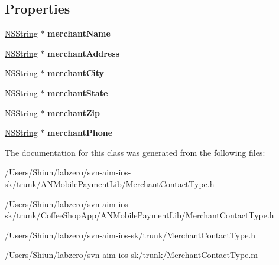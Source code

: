 \subsection*{Properties}
\begin{DoxyCompactItemize}
\item 
\hypertarget{interface_merchant_contact_type_a8791a083c70da0d6d590feb8400e52db}{
\hyperlink{class_n_s_string}{NSString} $\ast$ {\bfseries merchantName}}
\label{interface_merchant_contact_type_a8791a083c70da0d6d590feb8400e52db}

\item 
\hypertarget{interface_merchant_contact_type_a1dd3df16e04326b6a33e946027045009}{
\hyperlink{class_n_s_string}{NSString} $\ast$ {\bfseries merchantAddress}}
\label{interface_merchant_contact_type_a1dd3df16e04326b6a33e946027045009}

\item 
\hypertarget{interface_merchant_contact_type_ae1e86d3cc907483cd8f7ae2d26bd11ab}{
\hyperlink{class_n_s_string}{NSString} $\ast$ {\bfseries merchantCity}}
\label{interface_merchant_contact_type_ae1e86d3cc907483cd8f7ae2d26bd11ab}

\item 
\hypertarget{interface_merchant_contact_type_a76dc246ce315ada6152beb62e1dfb97c}{
\hyperlink{class_n_s_string}{NSString} $\ast$ {\bfseries merchantState}}
\label{interface_merchant_contact_type_a76dc246ce315ada6152beb62e1dfb97c}

\item 
\hypertarget{interface_merchant_contact_type_adf19fed08343076b6c615b78acbfcd4e}{
\hyperlink{class_n_s_string}{NSString} $\ast$ {\bfseries merchantZip}}
\label{interface_merchant_contact_type_adf19fed08343076b6c615b78acbfcd4e}

\item 
\hypertarget{interface_merchant_contact_type_a9ce67a52317d9ebedbd4b31e907bdf7b}{
\hyperlink{class_n_s_string}{NSString} $\ast$ {\bfseries merchantPhone}}
\label{interface_merchant_contact_type_a9ce67a52317d9ebedbd4b31e907bdf7b}

\end{DoxyCompactItemize}


The documentation for this class was generated from the following files:\begin{DoxyCompactItemize}
\item 
/Users/Shiun/labzero/svn-\/aim-\/ios-\/sk/trunk/ANMobilePaymentLib/MerchantContactType.h\item 
/Users/Shiun/labzero/svn-\/aim-\/ios-\/sk/trunk/CoffeeShopApp/ANMobilePaymentLib/MerchantContactType.h\item 
/Users/Shiun/labzero/svn-\/aim-\/ios-\/sk/trunk/MerchantContactType.h\item 
/Users/Shiun/labzero/svn-\/aim-\/ios-\/sk/trunk/MerchantContactType.m\end{DoxyCompactItemize}
